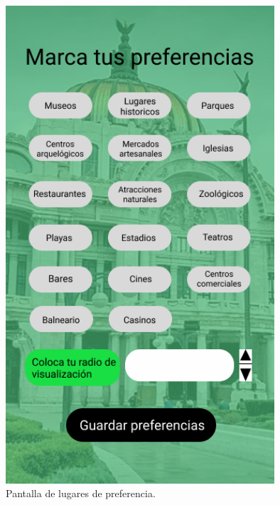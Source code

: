 \begin{figure}[htb]
    \centering
    \includegraphics[width=10cm]{pantalla4.png}
    \caption{Pantalla de lugares de preferencia.}
    \label{fig:enter-label}
\end{figure}

